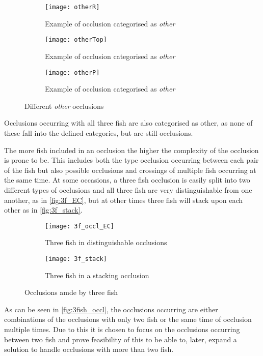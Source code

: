 \begin{figure}[H]
	\centering
	\begin{subfigure}[b]{0.3\textwidth}
		\texttt{[image: otherR]}
		\caption{Example of occlusion categorised as \textit{other}}
		\label{fig:otherR}
	\end{subfigure}
	\begin{subfigure}[b]{0.3\textwidth}
		\texttt{[image: otherTop]}
		\caption{Example of occlusion categorised as \textit{other}}
		\label{fig:otherTop}
	\end{subfigure}
	\begin{subfigure}[b]{0.3\textwidth}
		\texttt{[image: otherP]}
		\caption{Example of occlusion categorised as \textit{other}}
		\label{fig:otherP}
	\end{subfigure}
	\caption{Different \textit{other} occlusions}
	\label{fig:other}
\end{figure}

Occlusions occurring with all three fish are also categorised as other, as none of these fall into the defined categories, but are still occlusions.

The more fish included in an occlusion the higher the complexity of the occlusion is prone to be. This includes both the type occlusion occurring between each pair of the fish but also possible occlusions and crossings of multiple fish occurring at the same time. 
At some occasions, a three fish occlusion is easily split into two different types of occlusions and all three fish are very distinguishable from one another, as in \autoref{fig:3f_EC}, but at other times three fish will stack upon each other as in \autoref{fig:3f_stack}.

\begin{figure}[H]
	\centering
	\begin{subfigure}[b]{0.47\textwidth}
		\texttt{[image: 3f\_occl\_EC]}
		\caption{Three fish in distinguishable occlusions}
		\label{fig:3f_EC}
	\end{subfigure}
	\begin{subfigure}[b]{0.47\textwidth}
		\texttt{[image: 3f\_stack]}
		\caption{Three fish in a stacking occlusion}
		\label{fig:3f_stack}
	\end{subfigure}
	\caption{Occlusions amde by three fish}
	\label{fig:3fish_occl}
\end{figure}

As can be seen in \autoref{fig:3fish_occl}, the occlusions occurring are either combinations of the occlusions with only two fish or the same time of occlusion multiple times. Due to this it is chosen to focus on the occlusions occurring between two fish and prove feasibility of this to be able to, later, expand a solution to handle occlusions with more than two fish.

